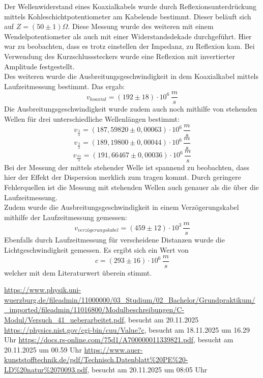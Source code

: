\documentclass[a4paper,10pt,twocolumn]{scrartcl} %
\begin{document}
Der Wellenwiderstand eines Koaxialkabels wurde durch Reflexionsunterdrückung
mittels Kohleschichtpotentiometer am Kabelende bestimmt. Dieser beläuft sich auf
$Z = (50 \pm 1)\Omega$. Diese Messung wurde des weiteren mit einem Wendelpotentiometer als auch mit einer Widerstandsdekade durchgeführt. Hier war zu beobachten,
dass es trotz einstellen der Impedanz, zu Reflexion kam. Bei Verwendung des Kurzschlusssteckers wurde eine Reflexion mit invertierter Amplitude festgestellt.\\
Des weiteren wurde die Ausbreitungsgeschwindigkeit in dem Koaxialkabel mittels Laufzeitmessung bestimmt. Das ergab:
\begin{equation*}
	v_{koaxial} = (192 \pm 18) \cdot 10^6 \, \frac{m}{s}
\end{equation*}
 Die Ausbreitungsgeschwindigkeit wurde zudem auch noch mithilfe von stehenden Wellen für drei unterschiedliche Wellenlängen bestimmt:
 \begin{equation*}
	v_{\frac{\lambda}{4}} = (187,59820 \pm 0,00063) \cdot 10^6 \, \frac{m}{s}
\end{equation*}
\begin{equation*}
	v_{\frac{\lambda}{2}} = (189,19800 \pm 0,00044) \cdot 10^6 \, \frac{m}{s}
\end{equation*}
\begin{equation*}
	v_{\frac{3\lambda}{4}} = (191,66467 \pm 0,00036) \cdot 10^6 \, \frac{m}{s} 
 \end{equation*}
Bei der Messung der mittels stehender Welle ist spannend zu beobachten, dass hier der Effekt der Dispersion merklich zum tragen kommt.
Durch geringere Fehlerquellen ist die Messung mit stehenden Wellen auch genauer als die über die Laufzeitmessung. \\
Zudem wurde die Ausbreitungsgeschwindigkeit in einem Verzögerungskabel mithilfe der Laufzeitmessung gemessen:
\begin{equation*}
	v_{verzögerungskabel} = (459 \pm 12) \cdot 10^3 \, \frac{m}{s}
\end{equation*}
Ebenfalls durch Laufzeitmessung für verscheidene Distanzen wurde die Lichtgeschwindigkeit gemessen. Es ergibt sich ein Wert von
\begin{equation*}
	c = (293 \pm 16)\cdot 10^6 \, \frac{m}{s}
\end{equation*}
welcher mit dem Literaturwert überein stimmt.
\begin{thebibliography}{}    %
	\url{https://www.physik.uni-wuerzburg.de/fileadmin/11000000/03_Studium/02_Bachelor/Grundpraktikum/_imported/fileadmin/11016800/Modulbeschreibungen/C-Modul/Versuch_41_ueberarbeitet.pdf}, besucht am 20.11.2025
	\url{https://physics.nist.gov/cgi-bin/cuu/Value?c}, besucht am 18.11.2025 um 16.29 Uhr
	\url{https://docs.rs-online.com/75d1/A700000011339821.pdf}, besucht am 20.11.2025 um 00.59 Uhr
	\url{https://www.auer-kunststofftechnik.de/pdf/Technisch.Datenblatt\%20PE\%20-LD\%20natur\%2070093.pdf}, besucht am 20.11.2025 um 08:05 Uhr
\end{thebibliography}
\end{document}
